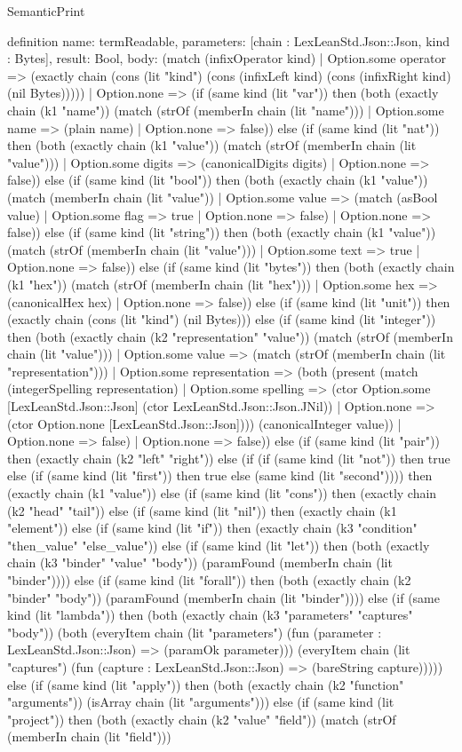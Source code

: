 \begin{lexlean}{SemanticPrint}
\begin{semanticmodule}
definition{
  name: termReadable,
  parameters: [chain : LexLeanStd.Json::Json, kind : Bytes],
  result: Bool,
  body: (match (infixOperator kind)
    | Option.some operator => (exactly chain (cons (lit "kind") (cons (infixLeft kind) (cons (infixRight kind) (nil Bytes)))))
    | Option.none => (if (same kind (lit "var")) then (both (exactly chain (k1 "name")) (match (strOf (memberIn chain (lit "name")))
      | Option.some name => (plain name)
      | Option.none => false)) else (if (same kind (lit "nat")) then (both (exactly chain (k1 "value")) (match (strOf (memberIn chain (lit "value")))
      | Option.some digits => (canonicalDigits digits)
      | Option.none => false)) else (if (same kind (lit "bool")) then (both (exactly chain (k1 "value")) (match (memberIn chain (lit "value"))
      | Option.some value => (match (asBool value)
        | Option.some flag => true
        | Option.none => false)
      | Option.none => false)) else (if (same kind (lit "string")) then (both (exactly chain (k1 "value")) (match (strOf (memberIn chain (lit "value")))
      | Option.some text => true
      | Option.none => false)) else (if (same kind (lit "bytes")) then (both (exactly chain (k1 "hex")) (match (strOf (memberIn chain (lit "hex")))
      | Option.some hex => (canonicalHex hex)
      | Option.none => false)) else (if (same kind (lit "unit")) then (exactly chain (cons (lit "kind") (nil Bytes))) else (if (same kind (lit "integer")) then (both (exactly chain (k2 "representation" "value")) (match (strOf (memberIn chain (lit "value")))
      | Option.some value => (match (strOf (memberIn chain (lit "representation")))
        | Option.some representation => (both (present (match (integerSpelling representation)
          | Option.some spelling => (ctor Option.some [LexLeanStd.Json::Json] (ctor LexLeanStd.Json::Json.JNil))
          | Option.none => (ctor Option.none [LexLeanStd.Json::Json]))) (canonicalInteger value))
        | Option.none => false)
      | Option.none => false)) else (if (same kind (lit "pair")) then (exactly chain (k2 "left" "right")) else (if (if (same kind (lit "not")) then true else (if (same kind (lit "first")) then true else (same kind (lit "second")))) then (exactly chain (k1 "value")) else (if (same kind (lit "cons")) then (exactly chain (k2 "head" "tail")) else (if (same kind (lit "nil")) then (exactly chain (k1 "element")) else (if (same kind (lit "if")) then (exactly chain (k3 "condition" "then_value" "else_value")) else (if (same kind (lit "let")) then (both (exactly chain (k3 "binder" "value" "body")) (paramFound (memberIn chain (lit "binder")))) else (if (same kind (lit "forall")) then (both (exactly chain (k2 "binder" "body")) (paramFound (memberIn chain (lit "binder")))) else (if (same kind (lit "lambda")) then (both (exactly chain (k3 "parameters" "captures" "body")) (both (everyItem chain (lit "parameters") (fun (parameter : LexLeanStd.Json::Json) => (paramOk parameter))) (everyItem chain (lit "captures") (fun (capture : LexLeanStd.Json::Json) => (bareString capture))))) else (if (same kind (lit "apply")) then (both (exactly chain (k2 "function" "arguments")) (isArray chain (lit "arguments"))) else (if (same kind (lit "project")) then (both (exactly chain (k2 "value" "field")) (match (strOf (memberIn chain (lit "field")))
}
\end{semanticmodule}
\end{lexlean}
